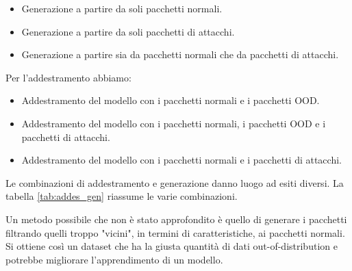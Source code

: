 \begin{itemize}
  \item Generazione a partire da soli pacchetti normali.
  \item Generazione a partire da soli pacchetti di attacchi.
  \item Generazione a partire sia da pacchetti normali che da pacchetti di attacchi.
\end{itemize}

Per l'addestramento abbiamo:

\begin{itemize}
  \item Addestramento del modello con i pacchetti normali e i pacchetti OOD.
  \item Addestramento del modello con i pacchetti normali, i pacchetti OOD e i pacchetti di attacchi.
  \item Addestramento del modello con i pacchetti normali e i pacchetti di attacchi.
\end{itemize}

Le combinazioni di addestramento e generazione danno luogo ad esiti diversi. La tabella \ref{tab:addes_gen} riassume le varie combinazioni.

\begin{table}\centering\setlength\tabcolsep{3.5pt}\renewcommand{}
  \noindent{}%
\caption{\label{tab:addes_gen} Combinazioni di generazione dei pacchetti e addestramento del modello, dove N = pacchetti normali, AV = pacchetti di attacchi veri, OOD = pacchetti generati. Si trova poi AV OOD, N OOD, N+AV OOD, rispettivamente dati generati a partire da attacchi, dati generati a partire da pacchetti normali, dati generati a partire dal dataset completo}
\end{table}


Un metodo possibile che non è stato approfondito è quello di generare i pacchetti filtrando quelli troppo "vicini", in termini di caratteristiche, ai pacchetti normali. Si ottiene così un dataset che ha la giusta quantità di dati out-of-distribution e potrebbe migliorare l'apprendimento di un modello.

